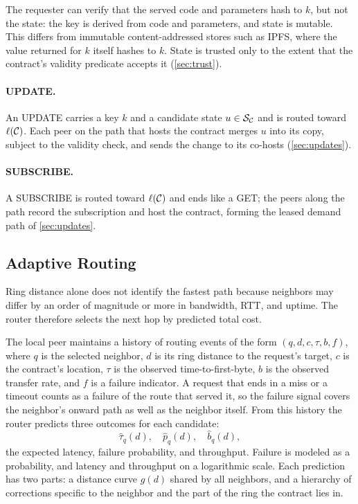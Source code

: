 The requester can verify that the served code and parameters hash to $k$, but not the state: the key is derived from code and parameters, and state is mutable. This differs from immutable content-addressed stores such as IPFS, where the value returned for $k$ itself hashes to $k$. State is trusted only to the extent that the contract's validity predicate accepts it (\cref{sec:trust}).

\paragraph{\textsf{UPDATE}.} An \textsf{UPDATE} carries a key $k$ and a candidate state $u \in \mathcal{S}_{\mathcal{C}}$ and is routed toward $\ell(\mathcal{C})$. Each peer on the path that hosts the contract merges $u$ into its copy, subject to the validity check, and sends the change to its co-hosts (\cref{sec:updates}).

\paragraph{\textsf{SUBSCRIBE}.} A \textsf{SUBSCRIBE} is routed toward $\ell(\mathcal{C})$ and ends like a \textsf{GET}; the peers along the path record the subscription and host the contract, forming the leased demand path of \cref{sec:updates}.

\subsection{Adaptive Routing}
\label{sec:adaptive}

Ring distance alone does not identify the fastest path because neighbors may differ by an order of magnitude or more in bandwidth, RTT, and uptime. The router therefore selects the next hop by predicted total cost.

The local peer maintains a history of routing events of the form $(q,d,c,\tau,b,f)$, where $q$ is the selected neighbor, $d$ is its ring distance to the request's target, $c$ is the contract's location, $\tau$ is the observed time-to-first-byte, $b$ is the observed transfer rate, and $f$ is a failure indicator. A request that ends in a miss or a timeout counts as a failure of the route that served it, so the failure signal covers the neighbor's onward path as well as the neighbor itself. From this history the router predicts three outcomes for each candidate:
\[
  \widehat{\tau}_q(d), \quad \widehat{p}_q(d), \quad \widehat{b}_q(d),
\]
the expected latency, failure probability, and throughput. Failure is modeled as a probability, and latency and throughput on a logarithmic scale. Each prediction has two parts: a distance curve $g(d)$ shared by all neighbors, and a hierarchy of corrections specific to the neighbor and the part of the ring the contract lies in.

